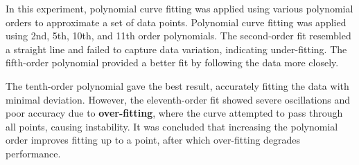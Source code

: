 \documentclass[a4paper,12pt]{article}
\begin{document}
	
	
	
		In this experiment, polynomial curve fitting was applied using various polynomial orders to approximate a set of data points. Polynomial curve fitting was applied using 2nd, 5th, 10th, and 11th order polynomials. The second-order fit resembled a straight line and failed to capture data variation, indicating under-fitting. The fifth-order polynomial provided a better fit by following the data more closely.
	
	The tenth-order polynomial gave the best result, accurately fitting the data with minimal deviation. However, the eleventh-order fit showed severe oscillations and poor accuracy due to \textbf{over-fitting}, where the curve attempted to pass through all points, causing instability. It was concluded that increasing the polynomial order improves fitting up to a point, after which over-fitting degrades performance.
	
	
\end{document}
